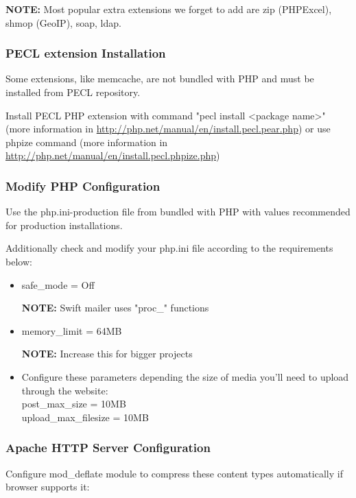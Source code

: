 \documentclass[12pt]{article}
\newcommand{\vigShowNotes}{1}
\newcommand{\note}[1]{
\textbf{NOTE:} 
#1
}
\begin{document}
\note{Most popular extra extensions we forget to add are \textsf{zip} (PHPExcel), \textsf{shmop} (GeoIP), \textsf{soap}, \textsf{ldap}.}

\subsubsection{PECL extension Installation}
Some extensions, like \textsf{memcache}, are not bundled with PHP and must be installed from PECL repository.

Install PECL PHP extension with command "pecl install <package name>" (more information in \url{http://php.net/manual/en/install.pecl.pear.php}) or use phpize command (more information in \url{http://php.net/manual/en/install.pecl.phpize.php})

\subsubsection{Modify PHP Configuration}

Use the php.ini-production file from bundled with PHP with values recommended for production installations.

Additionally check and modify your php.ini file according to the requirements below:

\begin{itemize}
	\item \textsf{safe\_mode = Off}
	
	\note{Swift mailer uses "proc\_\*" functions}
	
	\item \textsf{memory\_limit = 64MB}
	
	\note{Increase this for bigger projects}
	
	\item Configure these parameters depending the size of media you'll need to upload through the website:
	\\ \textsf{post\_max\_size = 10MB}
	\\ \textsf{upload\_max\_filesize = 10MB}
	
\end{itemize}

\subsubsection{Apache HTTP Server Configuration}

Configure \textsf{mod\_deflate} module to compress these content types automatically if browser supports it:
\end{document}
